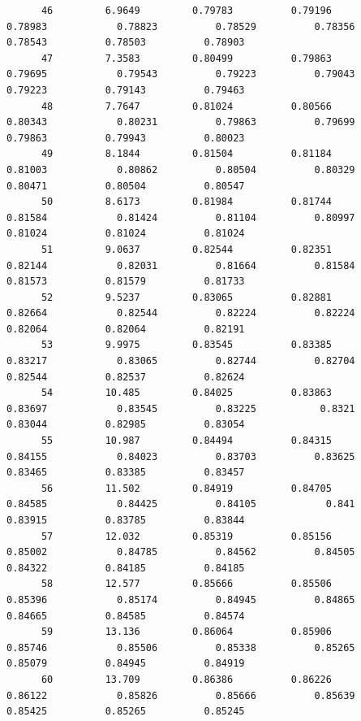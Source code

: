 \documentclass[
]{book}
\begin{document}
\begin{verbatim}
      46         6.9649         0.79783          0.79196           0.78983            0.78823          0.78529          0.78356          0.78543          0.78503          0.78903   
      47         7.3583         0.80499          0.79863           0.79695            0.79543          0.79223          0.79043          0.79223          0.79143          0.79463   
      48         7.7647         0.81024          0.80566           0.80343            0.80231          0.79863          0.79699          0.79863          0.79943          0.80023   
      49         8.1844         0.81504          0.81184           0.81003            0.80862          0.80504          0.80329          0.80471          0.80504          0.80547   
      50         8.6173         0.81984          0.81744           0.81584            0.81424          0.81104          0.80997          0.81024          0.81024          0.81024   
      51         9.0637         0.82544          0.82351           0.82144            0.82031          0.81664          0.81584          0.81573          0.81579          0.81733   
      52         9.5237         0.83065          0.82881           0.82664            0.82544          0.82224          0.82224          0.82064          0.82064          0.82191   
      53         9.9975         0.83545          0.83385           0.83217            0.83065          0.82744          0.82704          0.82544          0.82537          0.82624   
      54         10.485         0.84025          0.83863           0.83697            0.83545          0.83225           0.8321          0.83044          0.82985          0.83054   
      55         10.987         0.84494          0.84315           0.84155            0.84023          0.83703          0.83625          0.83465          0.83385          0.83457   
      56         11.502         0.84919          0.84705           0.84585            0.84425          0.84105            0.841          0.83915          0.83785          0.83844   
      57         12.032         0.85319          0.85156           0.85002            0.84785          0.84562          0.84505          0.84322          0.84185          0.84185   
      58         12.577         0.85666          0.85506           0.85396            0.85174          0.84945          0.84865          0.84665          0.84585          0.84574   
      59         13.136         0.86064          0.85906           0.85746            0.85506          0.85338          0.85265          0.85079          0.84945          0.84919   
      60         13.709         0.86386          0.86226           0.86122            0.85826          0.85666          0.85639          0.85425          0.85265          0.85245   

\end{verbatim}
\end{document}

